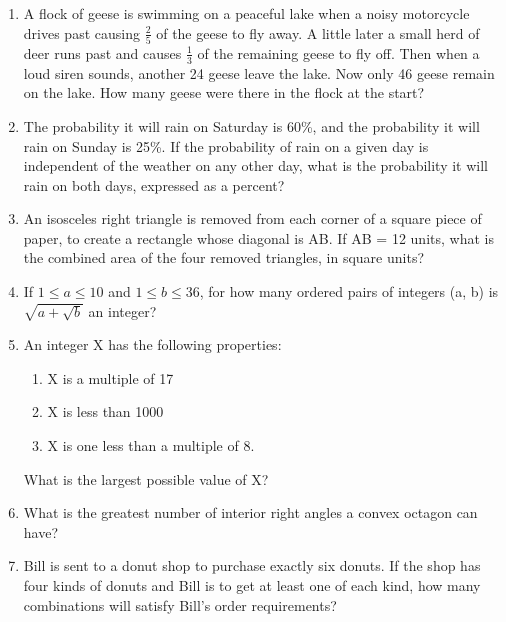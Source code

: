 \documentclass[12pt]{article}
\begin{document}
\begin{enumerate}
\vspace{1cm}
\item A flock of geese is swimming on a peaceful
lake when a noisy motorcycle drives past causing
$\frac{2}{5}$ of the geese to fly away. A little later a small
herd of deer runs past and causes $\frac{1}{3}$ of the
remaining geese to fly off. Then when a loud
siren sounds, another 24 geese leave the lake.
Now only 46 geese remain on the lake. How
many geese were there in the flock at the start?
\vspace{1cm}
\item The probability it will rain on Saturday
is 60\%, and the probability it will rain
on Sunday is 25\%. If the probability of
rain on a given day is independent of
the weather on any other day, what is
the probability it will rain on both days,
expressed as a percent?
\vspace{1cm}
\item An isosceles right triangle is removed from each
corner of a square piece of paper, to
create a rectangle whose diagonal is AB. If AB = 12 units, what is the
combined area of the four removed triangles, in
square units?
\vspace{1cm}
\item If $1 \le a \le 10$ and $1 \le b \le 36$, for how many ordered pairs of
integers (a, b) is $\sqrt{a + \sqrt{b}}$  an integer?

\vspace{1cm}

\item An integer X has the following properties:
\begin{enumerate}
\item X is a multiple of 17
\item X is less than 1000
\item X is one less than a multiple of 8.
\end{enumerate}
What is the largest possible value of X?


\vspace{1cm}

\item What is the greatest number of interior right angles a convex
octagon can have?
\vspace{1cm}

\item Bill is sent to a donut shop to purchase exactly six donuts. If the shop has four kinds of donuts and Bill is to get at least one of each kind, how many combinations will satisfy Bill’s order requirements?
\vspace{1cm}


\end{enumerate}
\end{document}
